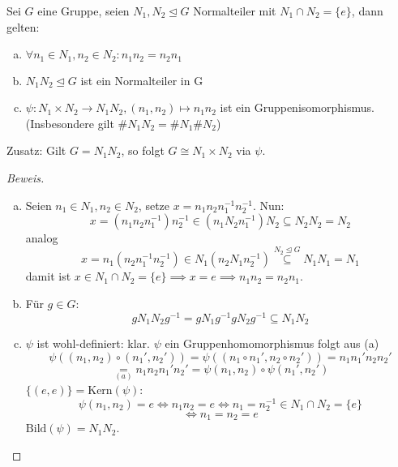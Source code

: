 \documentclass[a4paper]{report}
\begin{document}
\begin{prop}
  Sei $G$ eine Gruppe, seien $N_{1}, N_{2} \trianglelefteq G$ Normalteiler mit $N_{1} \cap N_{2} = \{e\}$, dann gelten:
  \begin{enumerate}[(a)]
    \item $\forall n_{1} \in N_{1}, n_{2} \in N_{2}: n_{1}n_{2} = n_{2}n_{1}$
    \item $N_{1}N_{2} \trianglelefteq G$ ist ein Normalteiler in G
    \item $\psi : N_{1} \times N_{2} \to N_{1}N_{2}, (n_{1},n_{2}) \mapsto n_{1}n_{2}$ ist ein Gruppenisomorphismus. (Insbesondere gilt $\#N_{1}N_{2} = \#N_{1} \#N_{2}$)
  \end{enumerate}
  Zusatz: Gilt $G = N_{1}N_{2}$, so folgt $G \cong N_{1} \times N_{2}$ via $\psi$.
  \begin{proof}[Beweis]
\begin{enumerate}[(a)]
  \item  Seien $n_{1} \in N_{1}, n_{2} \in N_{2}$, setze $x = n_{1}n_{2}n_{1}^{-1}n_{2}^{-1}$.
        Nun: $$x = (n_{1}n_{2}n_{1}^{-1})n_{2}^{-1} \in (n_{1}N_{2}n_{1}^{-1})N_{2} \subseteq N_{2}N_{2} = N_{2}$$
        analog $$x = n_{1}(n_{2}n_{1}^{-1}n_{2}^{-1}) \in N_{1}(n_{2}N_{1}n_{2}^{-1}) \overset{N_{2} \trianglelefteq G}\subseteq N_{1}N_{1} = N_{1}$$
        damit ist $x \in N_{1} \cap N_{2} = \{e\} \implies x = e \implies n_{1}n_{2} = n_{2}n_{1}$.

  \item Für $g \in G$:
        $$gN_{1}N_{2}g^{-1}= gN_{1}g^{-1}gN_{2}g^{-1} \subseteq  N_{1}N_{2}$$

  \item $\psi$ ist wohl-definiert: klar. $\psi$ ein Gruppenhomomorphismus folgt aus (a)
        $$\psi((n_{1}, n_{2}) \circ (n_{1}', n_{2}')) = \psi((n_{1} \circ n_{1}', n_{2} \circ n_{2}')) = n_{1}n_{1}' n_{2}n_{2}'$$
        $$\underset{(a)}= n_{1}n_{2}n_{1}'n_{2}' = \psi(n_{1}, n_{2}) \circ \psi(n_{1}', n_{2}')$$
        $\{(e, e)\} = \mathrm{Kern}(\psi)$:
        $$\psi(n_{1}, n_{2}) = e \iff n_{1}n_{2} = e \iff n_{1} = n_{2}^{-1} \in N_{1}\cap N_{2} = \{e\}$$
        $$\iff n_{1} = n_{2} = e$$
$\mathrm{Bild}(\psi) = N_{1}N_{2}$.\qedhere
\end{enumerate}
  \end{proof}
\end{prop}
\end{document}
